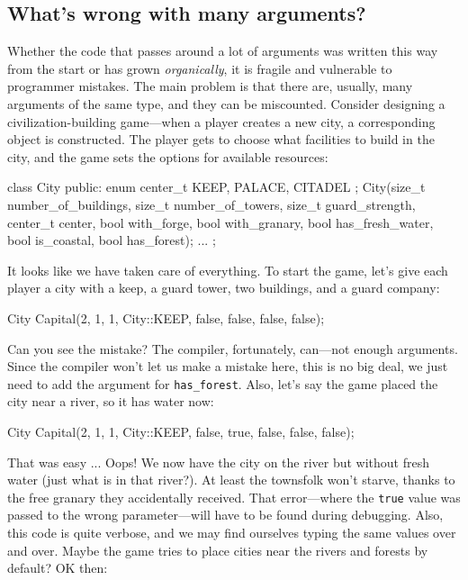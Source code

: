 \subsection{What's wrong with many arguments?}

Whether the code that passes around a lot of arguments was written this way from the start or has grown \emph{organically}, it is fragile and vulnerable to programmer mistakes. The main problem is that there are, usually, many arguments of the same type, and they can be miscounted. Consider designing a civilization-building game---when a player creates a new city, a corresponding object is constructed. The player gets to choose what facilities to build in the city, and the game sets the options for available resources:

\begin{code}
class City {
  public:
  enum center_t { KEEP, PALACE, CITADEL };
  City(size_t number_of_buildings,
       size_t number_of_towers,
       size_t guard_strength,
       center_t center,
       bool with_forge,
       bool with_granary,
       bool has_fresh_water,
       bool is_coastal,
       bool has_forest);
  ...
};
\end{code}

It looks like we have taken care of everything. To start the game, let's give each player a city with a keep, a guard tower, two buildings, and a guard company:

\begin{code}
City Capital(2, 1, 1, City::KEEP,
             false, false, false, false);
\end{code}

Can you see the mistake? The compiler, fortunately, can---not enough arguments. Since the compiler won't let us make a mistake here, this is no big deal, we just need to add the argument for \texttt{has\_forest}. Also, let's say the game placed the city near a river, so it has water now:

\begin{code}
City Capital(2, 1, 1, City::KEEP,
             false, true, false, false, false);
\end{code}

That was easy ... Oops! We now have the city on the river but without fresh water (just what is in that river?). At least the townsfolk won't starve, thanks to the free granary they accidentally received. That error---where the \texttt{true} value was passed to the wrong parameter---will have to be found during debugging. Also, this code is quite verbose, and we may find ourselves typing the same values over and over. Maybe the game tries to place cities near the rivers and forests by default? OK then:

